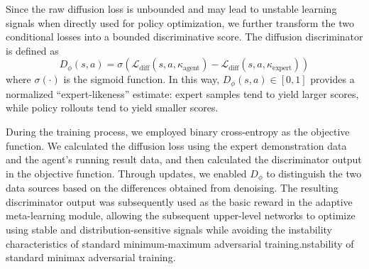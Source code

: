\documentclass[lettersize,journal]{IEEEtran}
\begin{document}
Since the raw diffusion loss is unbounded and may lead to unstable learning signals when directly used for policy optimization, we further transform the two conditional losses into a bounded discriminative score. The diffusion discriminator is defined as
\begin{equation}
  \label{eq:discriminator}
  D_\phi(s,a)=\sigma\left(\mathcal{L}_{\text{diff}}(s,a,\kappa_{\text{agent}}) -\mathcal{L}_{\text{diff}}(s,a,\kappa_{\text{expert}})\right)
\end{equation}
where $\sigma(\cdot)$ is the sigmoid function. In this way, $D_\phi(s,a)\in[0,1]$ provides a normalized “expert-likeness” estimate: expert samples tend to yield larger scores, while policy rollouts tend to yield smaller scores.

During the training process, we employed binary cross-entropy as the objective function. We calculated the diffusion loss using the expert demonstration data and the agent's running result data, and then calculated the discriminator output in the objective function. Through updates, we enabled $D_\phi$ to distinguish the two data sources based on the differences obtained from denoising. The resulting discriminator output was subsequently used as the basic reward in the adaptive meta-learning module, allowing the subsequent upper-level networks to optimize using stable and distribution-sensitive signals while avoiding the instability characteristics of standard minimum-maximum adversarial training.nstability of standard minimax adversarial training.
\end{document}

